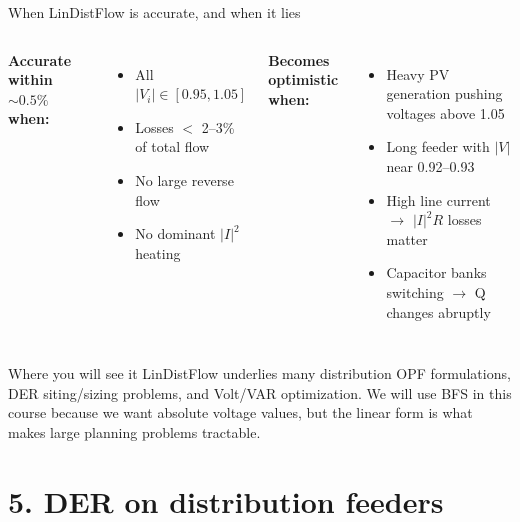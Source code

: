 \documentclass[aspectratio=169,10pt]{beamer}
\begin{document}
\begin{frame}{When LinDistFlow is accurate, and when it lies}
\begin{columns}[T]
\textbf{Accurate within $\sim 0.5\%$ when:}
\begin{itemize}
  \item All $|V_i| \in [0.95, 1.05]$
  \item Losses $<$ 2--3\% of total flow
  \item No large reverse flow
  \item No dominant $|I|^2$ heating
\end{itemize}
\textbf{Becomes optimistic when:}
\begin{itemize}
  \item Heavy PV generation pushing voltages above 1.05
  \item Long feeder with $|V|$ near 0.92--0.93
  \item High line current $\rightarrow$ $|I|^2 R$ losses matter
  \item Capacitor banks switching $\rightarrow$ Q changes abruptly
\end{itemize}
\end{columns}
\vspace{0.5em}
\begin{block}{Where you will see it}
LinDistFlow underlies many distribution OPF formulations, DER siting/sizing problems, and Volt/VAR optimization. We will use BFS in this course because we want absolute voltage values, but the linear form is what makes large planning problems tractable.
\end{block}
\end{frame}

\section*{5. DER on distribution feeders}
\end{document}
